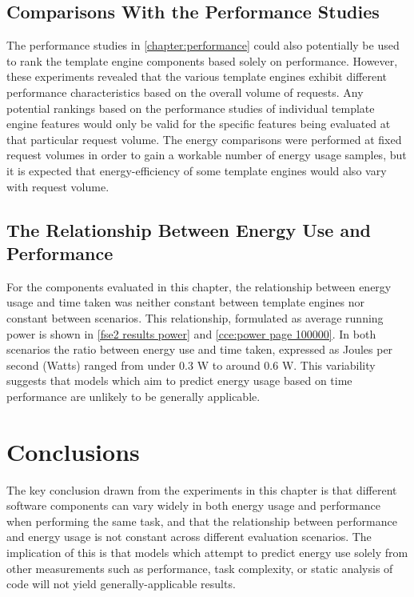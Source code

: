 \subsection{Comparisons With the Performance Studies}
\label{ce performance}

The performance studies in \autoref{chapter:performance} could also potentially be used to rank the template engine components based solely on performance. However, these experiments revealed that the various template engines exhibit different performance characteristics based on the overall volume of requests. Any potential rankings based on the performance studies of individual template engine features would only be valid for the specific features being evaluated at that particular request volume. The energy comparisons were performed at fixed request volumes in order to gain a workable number of energy usage samples, but it is expected that energy-efficiency of some template engines would also vary with request volume.

\subsection{The Relationship Between Energy Use and Performance}
\label{ce relationship}

For the components evaluated in this chapter, the relationship between energy usage and time taken was neither constant between template engines nor constant between scenarios. This relationship, formulated as average running power is shown in \autoref{fse2 results power} and \autoref{cce:power page 100000}. In both scenarios the ratio between energy use and time taken, expressed as Joules per second (Watts) ranged from under 0.3 W to around 0.6 W. This variability suggests that models which aim to predict energy usage based on time performance are unlikely to be generally applicable.

\section{Conclusions}
\label{ce conclusions}

The key conclusion drawn from the experiments in this chapter is that different software components can vary widely in both energy usage and performance when performing the same task, and that the relationship between performance and energy usage is not constant across different evaluation scenarios. The implication of this is that models which attempt to predict energy use solely from other measurements such as performance, task complexity, or static analysis of code will not yield generally-applicable results.